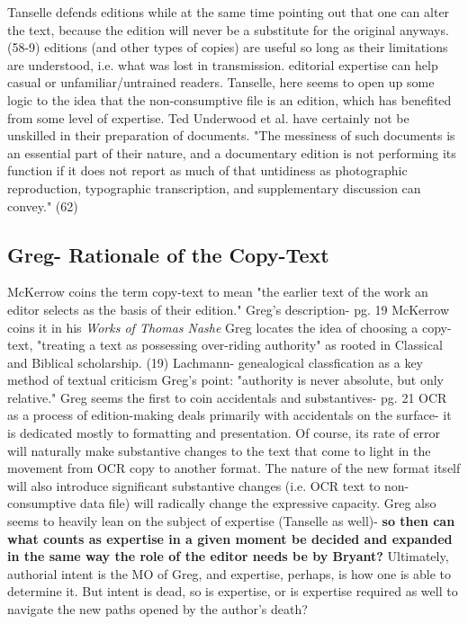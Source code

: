 \documentclass[course, english]{Notes}
\newcommand{\n}{\scalebox{2}{\textbf{\framebox{$\aleph$} } } }
\begin{document}
\begin{outline}
\1 Tanselle defends editions while at the same time pointing out that one can alter the text, because the edition will never be a substitute for the original anyways. (58-9)
	\2 editions (and other types of copies) are useful so long as their limitations are understood, i.e. what was lost in transmission.
	\2 editorial expertise can help casual or unfamiliar/untrained readers.
	\2 \n Tanselle, here seems to open up some logic to the idea that the non-consumptive file is an edition, which has benefited from some level of expertise. Ted Underwood et al. have certainly not be unskilled in their preparation of documents. 
\1 "The messiness of such documents is an essential part of their nature, and a documentary edition is not performing its function if it does not report as much of that untidiness as photographic reproduction, typographic transcription, and supplementary discussion can convey." (62)
 \end{outline}
 
\subsection{Greg- Rationale of the Copy-Text}
\begin{outline}
\1  McKerrow coins the term copy-text to mean "the earlier text of the work an editor selects as the basis of their edition." Greg's description- pg. 19
	\2 McKerrow coins it in his \textit{Works of Thomas Nashe}
\1 Greg locates the idea of choosing a copy-text, "treating a text as possessing over-riding authority" as rooted in Classical and Biblical scholarship. (19)
\1 Lachmann- genealogical classfication as a key method of textual criticism
\1 Greg's point: "authority is never absolute, but only relative."
\1 Greg seems the first to coin accidentals and substantives- pg. 21
	\2 \n OCR as a process of edition-making deals primarily with accidentals on the surface- it is dedicated mostly to formatting and presentation. Of course, its rate of error will naturally make substantive changes to the text that come to light in the movement from OCR copy to another format. The nature of the new format itself will also introduce significant substantive changes (i.e. OCR text to non-consumptive data file) will radically change the expressive capacity.
\1 Greg also seems to heavily lean on the subject of expertise (Tanselle as well)- \textbf{so then can what counts as expertise in a given moment be decided and expanded in the same way the role of the editor needs be by Bryant?}
\1 Ultimately, authorial intent is the MO of Greg, and expertise, perhaps, is how one is able to determine it. 
	\2 But intent is dead, so is expertise, or is expertise required as well to navigate the new paths opened by the author's death? 
 
\end{outline}
\end{document}
